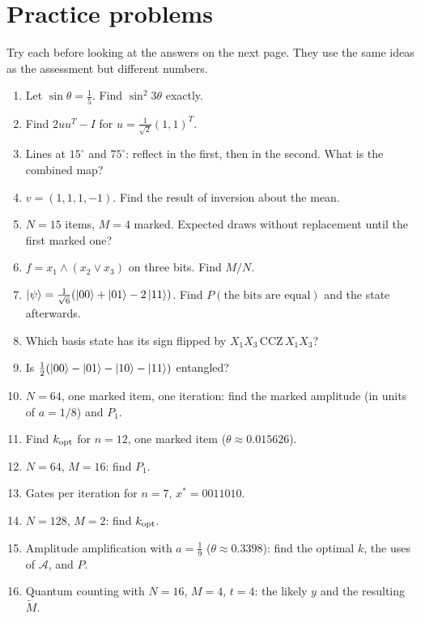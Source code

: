 \documentclass[11pt,a4paper,openany]{book}
\newcommand{\kopt}{k_{\rm opt}}
\newcommand{\xs}{x^\ast}
\begin{document}
\section{Practice problems}
Try each before looking at the answers on the next page. They use the same ideas as the assessment but different numbers.
\begin{enumerate}[label=\textbf{P\arabic*.}, leftmargin=2.6em, itemsep=1pt]
\item Let $\sin\theta = \frac15$. Find $\sin^2 3\theta$ exactly.
\item Find $2uu^{T} - I$ for $u = \frac{1}{\sqrt2}(1, 1)^{T}$.
\item Lines at $15^\circ$ and $75^\circ$: reflect in the first, then in the second. What is the combined map?
\item $v = (1, 1, 1, -1)$. Find the result of inversion about the mean.
\item $N = 15$ items, $M = 4$ marked. Expected draws without replacement until the first marked one?
\item $f = x_1 \land (x_2 \lor x_3)$ on three bits. Find $M/N$.
\item $\ket\psi = \frac{1}{\sqrt6}(\ket{00} + \ket{01} - 2\ket{11})$. Find $P(\text{the bits are equal})$ and the state afterwards.
\item Which basis state has its sign flipped by $X_1X_3\,\mathrm{CCZ}\,X_1X_3$?
\item Is $\frac12(\ket{00} - \ket{01} - \ket{10} - \ket{11})$ entangled?
\item $N = 64$, one marked item, one iteration: find the marked amplitude (in units of $a = 1/8$) and $P_1$.
\item Find $\kopt$ for $n = 12$, one marked item ($\theta \approx 0.015626$).
\item $N = 64$, $M = 16$: find $P_1$.
\item Gates per iteration for $n = 7$, $\xs = 0011010$.
\item $N = 128$, $M = 2$: find $\kopt$.
\item Amplitude amplification with $a = \frac19$ ($\theta \approx 0.3398$): find the optimal $k$, the uses of $\mathcal{A}$, and $P$.
\item Quantum counting with $N = 16$, $M = 4$, $t = 4$: the likely $y$ and the resulting $\tilde M$.
\end{enumerate}

\newpage
\end{document}
